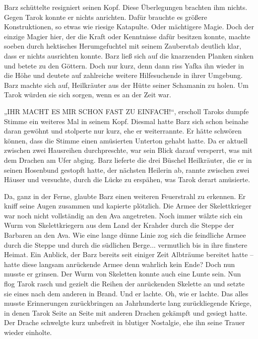 Barz schüttelte resigniert seinen Kopf. Diese Überlegungen brachten ihm nichts. Gegen Tarok konnte er nichts anrichten. Dafür brauchte es größere Konstruktionen, so etwas wie riesige Katapulte. Oder mächtigere Magie. Doch der einzige Magier hier, der die Kraft oder Kenntnisse dafür besitzen konnte, machte soeben durch hektisches Herumgefuchtel mit seinem Zauberstab deutlich klar, dass er nichts ausrichten konnte. Barz ließ sich auf die knarzenden Planken sinken und betete zu den Göttern. Doch nur kurz, denn dann riss Yafka ihn wieder in die Höhe und deutete auf zahlreiche weitere Hilfesuchende in ihrer Umgebung. Barz machte sich auf, Heilkräuter aus der Hütte seiner Schamanin zu holen. Um Tarok würden sie sich sorgen, wenn es an der Zeit war.

„IHR MACHT ES MIR SCHON FAST ZU EINFACH!“, erscholl Taroks dumpfe Stimme ein weiteres Mal in seinem Kopf. Diesmal hatte Barz sich schon beinahe daran gewöhnt und stolperte nur kurz, ehe er weiterrannte. Er hätte schwören können, dass die Stimme einen amüsierten Unterton gehabt hatte. Da er aktuell zwischen zwei Hausreihen durchpreschte, war sein Blick darauf versperrt, was mit dem Drachen am Ufer abging. Barz lieferte die drei Büschel Heilkräuter, die er in seinen Hosenbund gestopft hatte, der nächsten Heilerin ab, rannte zwischen zwei Häuser und versuchte, durch die Lücke zu erspähen, was Tarok derart amüsierte.

Da, ganz in der Ferne, glaubte Barz einen weiteren Feuerstrahl zu erkennen. Er kniff seine Augen zusammen und kapierte plötzlich. Die Armee der Skelettkrieger war noch nicht vollständig an den Ava angetreten. Noch immer wälzte sich ein Wurm von Skelettkriegern aus dem Land der Krahder durch die Steppe der Barbaren an den Ava. Wie eine lange dünne Linie zog sich die feindliche Armee durch die Steppe und durch die südlichen Berge... vermutlich bis in ihre finstere Heimat. Ein Anblick, der Barz bereits seit einiger Zeit Albträume bereitet hatte – hatte diese langsam anrückende Armee denn wahrlich kein Ende? Doch nun musste er grinsen. Der Wurm von Skeletten konnte auch eine Lunte sein. Nun flog Tarok rasch und gezielt die Reihen der anrückenden Skelette an und setzte sie eines nach dem anderen in Brand. Und er lachte. Oh, wie er lachte. Das alles musste Erinnerungen zurückbringen an Jahrhunderte lang zurückliegende Kriege, in denen Tarok Seite an Seite mit anderen Drachen gekämpft und gesiegt hatte. Der Drache schwelgte kurz unbefreit in blutiger Nostalgie, ehe ihn seine Trauer wieder einholte.

